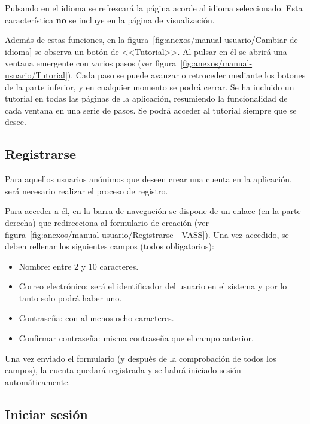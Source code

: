 Pulsando en el idioma se refrescará la página acorde al idioma seleccionado.
Esta característica \textbf{no} se incluye en la página de visualización.

Además de estas funciones, en la figura~\ref{fig:anexos/manual-usuario/Cambiar de idioma} se observa un botón de <<Tutorial>>. Al pulsar en él se abrirá una ventana emergente con varios pasos (ver figura~\ref{fig:anexos/manual-usuario/Tutorial}). Cada paso se puede avanzar o retroceder mediante los botones de la parte inferior, y en cualquier momento se podrá cerrar.
Se ha incluido un tutorial en todas las páginas de la aplicación, resumiendo la funcionalidad de cada ventana en una serie de pasos. Se podrá acceder al tutorial siempre que se desee.


\subsection{Registrarse}

Para aquellos usuarios anónimos que deseen crear una cuenta en la aplicación,
será necesario realizar el proceso de registro.

Para acceder a él, en la barra de navegación se dispone de un enlace (en la
parte derecha) que redirecciona al formulario de creación (ver
figura~\ref{fig:anexos/manual-usuario/Registrarse - VASS}). Una vez accedido, se
deben rellenar los siguientes campos (todos obligatorios):
\begin{itemize}
    \item Nombre: entre 2 y 10 caracteres.
    \item Correo electrónico: será el identificador del usuario en el sistema y
    por lo tanto solo podrá haber uno.
    \item Contraseña: con al menos ocho caracteres.
    \item Confirmar contraseña: misma contraseña que el campo anterior.
\end{itemize}


Una vez enviado el formulario (y después de la comprobación de todos los
campos), la cuenta quedará registrada y se habrá iniciado sesión
automáticamente.

\subsection{Iniciar sesión}

